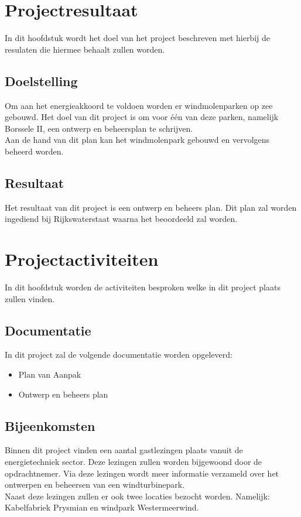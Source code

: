 \documentclass[numbers=endperiod]{scrartcl}
\newcommand{\whitespace}{\vspace*{2 mm} \\}%
\begin{document}
	\section{Projectresultaat}
	In dit hoofdstuk wordt het doel van het project beschreven met hierbij de resulaten die hiermee behaalt zullen worden.
	
	\subsection{Doelstelling}
	Om aan het energieakkoord te voldoen worden er windmolenparken op zee gebouwd. Het doel van dit project is om voor één van deze parken, namelijk Borssele II, een ontwerp en beheersplan te schrijven.
	\whitespace
	Aan de hand van dit plan kan het windmolenpark gebouwd en vervolgens beheerd worden.
	
	\subsection{Resultaat}	
	Het resultaat van dit project is een ontwerp en beheers plan. Dit plan zal worden ingediend bij Rijkswaterstaat waarna het beoordeeld zal worden.

	\section{Projectactiviteiten}
	In dit hoofdstuk worden de activiteiten besproken welke in dit project plaats zullen vinden.
	\subsection{Documentatie}
	In dit project zal de volgende documentatie worden opgeleverd:
	\begin{itemize}
	\item Plan van Aanpak
	\item Ontwerp en beheers plan
	\end{itemize}
	
	\subsection{Bijeenkomsten}
	Binnen dit project vinden een aantal gastlezingen plaats vanuit de energietechniek sector. Deze lezingen zullen worden bijgewoond door de opdrachtnemer. Via deze lezingen wordt meer informatie verzameld over het ontwerpen en beheersen van een windturbinepark.
	\whitespace
	Naast deze lezingen zullen er ook twee locaties bezocht worden. Namelijk: Kabelfabriek Prysmian en windpark Westermeerwind.
\end{document}
